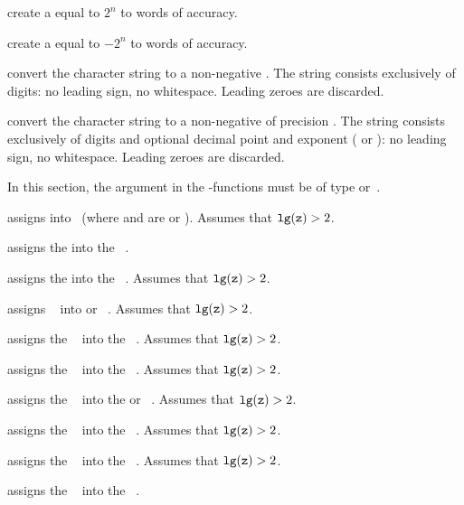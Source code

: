  create a  equal to $2^n$
to  words of accuracy.

 create a  equal to $-2^n$
to  words of accuracy.

 convert the character string  to a
non-negative . The string  consists exclusively of digits: no
leading sign, no whitespace. Leading zeroes are discarded.

 convert the character string  to
a non-negative  of precision . The string 
consists exclusively of digits and optional decimal point and exponent
( or ): no leading sign, no whitespace. Leading zeroes are
discarded.

In this section, the  argument in the -functions must be of type
 or~.

 assigns  into~ (where 
and  are  or ).
Assumes that ${\tt lg(z)} > 2$.

 assigns the   into the
~.

 assigns the   into the
~. Assumes that ${\tt lg(z)} > 2$.

 assigns ~ into  or
~. Assumes that ${\tt lg(z)} > 2$.

 assigns the ~ into the
~. Assumes that ${\tt lg(z)} > 2$.

 assigns the ~ into the
~. Assumes that ${\tt lg(z)} > 2$.

 assigns the ~ into the
 or ~. Assumes that ${\tt lg(z)} > 2$.

 assigns the ~ into the
~. Assumes that ${\tt lg(z)} > 2$.

 assigns the ~ into the
~. Assumes that ${\tt lg(z)} > 2$.

 assigns the ~ into the
~.

